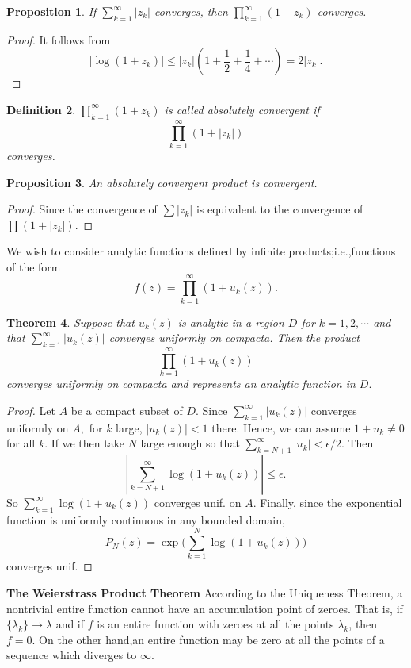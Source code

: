 \documentclass{book}
\newtheorem{defi}{Definition}[section]
\newtheorem{thm}[defi]{Theorem}
\newtheorem{prop}[defi]{Proposition}
\numberwithin{equation}{section}
\begin{document}
\begin{prop}
If $\sum_{k=1}^\infty |z_k|$ converges, then $\prod_{k=1}^\infty (1+z_k)$ converges.
\end{prop}
\begin{proof}
It follows from
$$
|\log(1+z_k)|\leq |z_k|(1+\frac{1}{2}+\frac{1}{4}+\cdots)=2|z_k|.
$$
\end{proof}

\begin{defi}
$\prod_{k=1}^\infty (1+z_k)$ is called absolutely convergent if 
$$
\prod_{k=1}^\infty (1+|z_k|) 
$$ converges.
\end{defi}

\begin{prop}
An absolutely convergent product is convergent.
\end{prop}
\begin{proof}
Since the convergence of $\sum |z_k|$ is equivalent to the convergence of $\prod{(1+|z_k|)}.$
\end{proof}

We wish to consider analytic functions deﬁned by inﬁnite products;i.e.,functions of the form 
$$
f(z)=\prod_{k=1}^\infty (1+u_k(z)).
$$

\begin{thm}
Suppose that $u_k(z)$ is analytic in a region $D$ for $k=1,2,\cdots$ and that $\sum_{k=1}^\infty |u_k(z)|$ converges uniformly on compacta. Then the product
$$
\prod_{k=1}^\infty (1+u_k(z)) 
$$ converges uniformly on compacta and represents an analytic function in $D.$
\end{thm}
\begin{proof}
Let $A$ be a compact subset of $D.$ Since $\sum_{k=1}^\infty |u_k(z)|$ converges uniformly on $A,$ for $k$ large, $|u_k(z)|<1$ there. Hence, we can assume $1+u_k \neq 0$ for all $k.$ If we then take $N$ large enough so that $\sum_{k=N+1}^\infty |u_k| <\epsilon/2.$ Then
$$
|\sum_{k=N+1}^\infty \log(1+u_k(z))|\leq \epsilon. 
$$ So $\sum_{k=1}^\infty \log(1+u_k(z))$ converges unif. on $A.$  Finally, since the exponential function is uniformly continuous in any bounded domain,
$$
P_N(z)=\exp \big(\sum_{k=1}^N \log(1+u_k(z))\big)
$$ converges unif.
\end{proof}

\textbf{The Weierstrass Product Theorem}
According to the Uniqueness Theorem, a nontrivial entire function cannot have an accumulation point of zeroes. That is, if $\{\lambda_k\} \rightarrow \lambda$ and if $f$ is an entire function with zeroes at all the points $\lambda_k$, then $f=0$. On the other hand,an entire function may be zero at all the points of a sequence which diverges to $\infty.$
\end{document}

